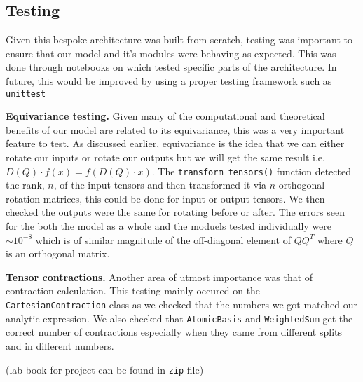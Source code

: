 \subsection{Testing} \label{sec:testing}

Given this bespoke architecture was built from scratch, testing was important to ensure that our model and it's modules were behaving as expected. This was done through notebooks on which tested specific parts of the architecture. In future, this would be improved by using a proper testing framework such as \texttt{unittest}

\textbf{Equivariance testing. } Given many of the computational and theoretical benefits of our model are related to its equivariance, this was a very important feature to test. As discussed earlier, equivariance is the idea that we can either rotate our inputs or rotate our outputs but we will get the same result i.e. $D(Q) \cdot f(x) = f(D(Q) \cdot x)$. The \texttt{transform\_tensors()} function detected the rank, $n$, of the input tensors and then transformed it via $n$ orthogonal rotation matrices, this could be done for input or output tensors. We then checked the outputs were the same for rotating before or after. The errors seen for the both the model as a whole and the moduels tested individually were $\sim 10^{-8}$ which is of similar magnitude of the off-diagonal element of $Q Q^T$ where $Q$ is an orthogonal matrix. 

\textbf{Tensor contractions. } Another area of utmost importance was that of contraction calculation. This testing mainly occured on the \texttt{CartesianContraction} class as we checked that the numbers we got matched our analytic expression. We also checked that \texttt{AtomicBasis} and \texttt{WeightedSum} get the correct number of contractions especially when they came from different splits and in different numbers. 

(lab book for project can be found in \texttt{zip} file)